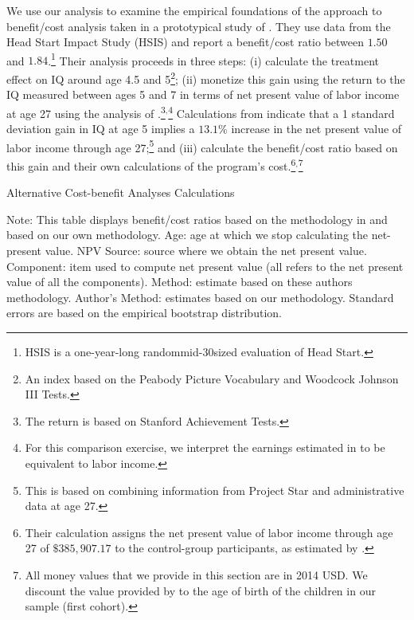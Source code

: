 We use our analysis to examine the empirical foundations of the approach to benefit/cost analysis taken in a prototypical study of \citet{Kline_Walters_2016_QJE}. They use data from the Head Start Impact Study (HSIS) and report a benefit/cost ratio between $1.50$ and $1.84$.\footnote{HSIS is a one-year-long randommid-30sized evaluation of Head Start.} Their analysis proceeds in three steps: (i) calculate the treatment effect on IQ around age 4.5 and 5\footnote{An index based on the Peabody Picture Vocabulary and Woodcock Johnson III Tests.}; (ii) monetize this gain using the return to the IQ measured between ages 5 and 7 in terms of net present value of labor income at age 27 using the analysis of \citet{Chetty_Friedman_etal_2011_QJoE}.\footnote{The \citet{Chetty_Friedman_etal_2011_QJoE} return is based on Stanford Achievement Tests.}$^,$\footnote{For this comparison exercise, we interpret the earnings estimated in \citet{Chetty_Friedman_etal_2011_QJoE} to be equivalent to labor income.} Calculations from \citet{Chetty_Friedman_etal_2011_QJoE} indicate that a 1 standard deviation gain in IQ at age 5 implies a $13.1\%$ increase in the net present value of labor income through age 27;\footnote{This is based on combining information from Project Star and administrative data at age 27.} and (iii) calculate the benefit/cost ratio based on this gain and their own calculations of the program's cost.\footnote{Their calculation assigns the net present value of labor income through age 27 of $\$385,907.17$ to the control-group participants, as estimated by  \citet{Chetty_Friedman_etal_2011_QJoE}.}$^,$\footnote{All money values that we provide in this section are in 2014 USD. We discount the value provided by \citet{Chetty_Friedman_etal_2011_QJoE} to the age of birth of the children in our sample (first cohort).}


\begin{table}[!htbp]
\begin{threeparttable}
\caption{Alternative Cost-benefit Analyses Calculations}
\label{table:comparing}
\centering
\footnotesize

\begin{tablenotes}
\footnotesize
\item Note: This table displays benefit/cost ratios based on the methodology in \citet{Kline_Walters_2016_QJE} and based on our own methodology. Age: age at which we stop calculating the net-present value. NPV Source: source where we obtain the net present value. Component: item used to compute net present value (all refers to the net present value of all the components). \citet{Kline_Walters_2016_QJE} Method: estimate based on these authors methodology. Author's Method: estimates based on our methodology. Standard errors are based on the empirical bootstrap distribution.
\end{tablenotes}
\end{threeparttable}
\end{table}

